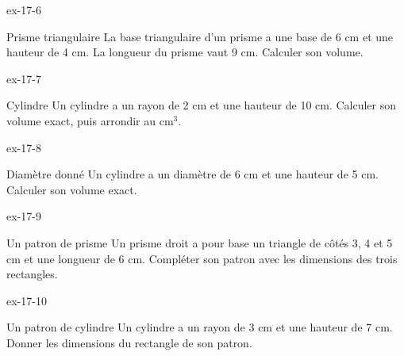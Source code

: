 \begin{blocLivre}{ex-17-6}\begin{exercice}[2]{Prisme triangulaire}
La base triangulaire d’un prisme a une base de 6 cm et une hauteur de 4 cm. La longueur du prisme vaut 9 cm. Calculer son volume.
\label{fig-ex-17-6}
\end{exercice}\end{blocLivre}
\begin{blocLivre}{ex-17-7}\begin{exercice}[2]{Cylindre}
Un cylindre a un rayon de 2 cm et une hauteur de 10 cm. Calculer son volume exact, puis arrondir au cm$^3$.
\label{fig-ex-17-7}
\end{exercice}\end{blocLivre}
\begin{blocLivre}{ex-17-8}\begin{exercice}[2]{Diamètre donné}
Un cylindre a un diamètre de 6 cm et une hauteur de 5 cm. Calculer son volume exact.
\label{fig-ex-17-8}
\end{exercice}\end{blocLivre}
\begin{blocLivre}{ex-17-9}\begin{exercice}[2]{Un patron de prisme}
Un prisme droit a pour base un triangle de côtés 3, 4 et 5 cm et une longueur de 6 cm. Compléter son patron avec les dimensions des trois rectangles.
\label{fig-ex-17-9}
\end{exercice}\end{blocLivre}
\begin{blocLivre}{ex-17-10}\begin{exercice}[2]{Un patron de cylindre}
Un cylindre a un rayon de 3 cm et une hauteur de 7 cm. Donner les dimensions du rectangle de son patron.
\label{fig-ex-17-10}
\end{exercice}\end{blocLivre}

